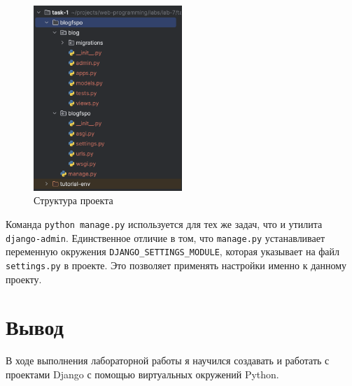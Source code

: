 \documentclass[a4paper, 14pt]{extarticle}
\begin{document}
\begin{figure}[H]
  \centering
  \includegraphics[width=0.5\textwidth]{images/pycharm.png}
  \caption{Структура проекта}
  \label{fig:pycharm}
\end{figure}

Команда \texttt{python manage.py} используется для тех же задач, что и утилита
\texttt{django-admin}. Единственное отличие в том, что \texttt{manage.py}
устанавливает переменную окружения \texttt{DJANGO\_SETTINGS\_MODULE}, которая
указывает на файл \texttt{settings.py} в проекте. Это позволяет применять
настройки именно к данному проекту.

\section{Вывод}

В ходе выполнения лабораторной работы я научился создавать и работать с
проектами Django с помощью виртуальных окружений Python.
\end{document}
